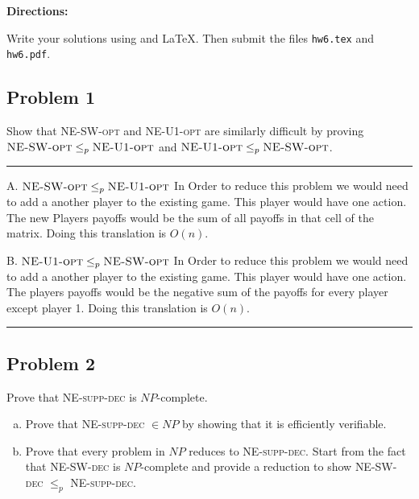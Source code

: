 \documentclass[11pt]{article}
\newcommand{\titlebox}[3]{
    \begin{center}
        \framebox{
            \vbox{
            \hbox to \textwidth { #1 \hfill #3}
            \vspace{-4mm}
            \hbox to \textwidth {\hfill \Large \bf #2 \hfill}
        }
    }
    \end{center}
}
\newcommand{\answer}[1]{
\vspace{.5\baselineskip} \hrule \vspace{.5\baselineskip}
#1
\vspace{.5\baselineskip} \hrule \vspace{.5\baselineskip}
}
\begin{document}
\titlebox{CSC 383, S'23}
{Homework 6}
{Due Mar. \nth{29}}

\textbf{Directions:}

Write your solutions using and \LaTeX.
Then submit the files \texttt{hw6.tex} and \texttt{hw6.pdf}.





\subsection*{Problem 1}

Show that \textsc{NE-SW-opt} and \textsc{NE-U1-opt} are similarly difficult by proving $\textsc{NE-SW-opt} \le_p \textsc{NE-U1-opt}$ and $\textsc{NE-U1-opt} \le_p \textsc{NE-SW-opt}$.


\answer{
A. $\textsc{NE-SW-opt} \le_p \textsc{NE-U1-opt}$ \newline
In Order to reduce this problem we would need to add a another player to the existing game. This player would have one action. The new Players payoffs would be the sum of all payoffs in that cell of the matrix. Doing this translation is $O(n)$. \newline

B. $\textsc{NE-U1-opt} \le_p \textsc{NE-SW-opt}$ \newline
In Order to reduce this problem we would need to add a another player to the existing game. This player would have one action. The players payoffs would be the negative sum of the payoffs for every player except player 1.   Doing this translation is $O(n)$. \newline


}



\subsection*{Problem 2}

Prove that \textsc{NE-supp-dec} is $NP$-complete.

\begin{enumerate}[(a)]
\item Prove that \textsc{NE-supp-dec} $\in NP$ by showing that it is efficiently verifiable.
\item Prove that every problem in $NP$ reduces to \textsc{NE-supp-dec}. Start from the fact that \textsc{NE-SW-dec} is $NP$-complete and provide a reduction to show \textsc{NE-SW-dec} $\le_p$ \textsc{NE-supp-dec}.
\end{enumerate}
\end{document}
